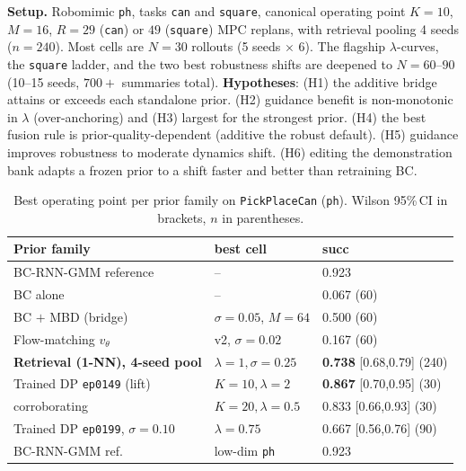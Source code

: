 \documentclass[letterpaper, 10 pt, conference]{ieeeconf}
\begin{document}
\textbf{Setup.} Robomimic \texttt{ph}, tasks \texttt{can} and
\texttt{square}, canonical operating point $K\!=\!10$, $M\!=\!16$,
$R\!=\!29$ (\texttt{can}) or $49$ (\texttt{square}) MPC replans, with
retrieval pooling 4 seeds ($n\!=\!240$). Most cells are $N\!=\!30$ rollouts
(5 seeds $\times$ 6). The flagship $\lambda$-curves, the \texttt{square}
ladder, and the two best robustness shifts are deepened to
$N\!=\!60$--$90$ (10--15 seeds, $700{+}$ summaries total).
\textbf{Hypotheses}: (H1) the additive bridge attains or exceeds each
standalone prior. (H2) guidance benefit is non-monotonic in $\lambda$
(over-anchoring) and (H3) largest for the strongest prior. (H4) the best
fusion rule is prior-quality-dependent (additive the robust default).
(H5) guidance improves robustness to moderate dynamics shift. (H6)
editing the demonstration bank adapts a frozen prior to a shift faster and
better than retraining BC.

\begin{table}[h]
\centering\scriptsize
\setlength{\tabcolsep}{2.5pt}
\renewcommand{\arraystretch}{0.95}
\caption{Best operating point per prior family on \texttt{PickPlaceCan}
(\texttt{ph}). Wilson 95\%\,CI in brackets, $n$ in parentheses.}
\label{tab:priors}
\begin{tabular}{@{}lll@{}}
\hline
Prior family & best cell & succ \\
\hline
BC-RNN-GMM reference                  & --                                 & 0.923 \\
BC alone                              & --                                 & 0.067 (60) \\
BC $+$ MBD (bridge)                   & $\sigma\!=\!0.05$, $M\!=\!64$       & 0.500 (60) \\
Flow-matching $v_\theta$              & v2, $\sigma\!=\!0.02$              & 0.167 (60) \\
\textbf{Retrieval (1-NN), 4-seed pool}& $\lambda\!=\!1,\sigma\!=\!0.25$    & \textbf{0.738} [0.68,0.79] (240) \\
Trained DP \texttt{ep0149} (lift)     & $K\!=\!10,\lambda\!=\!2$           & \textbf{0.867} [0.70,0.95] (30) \\
\quad corroborating                   & $K\!=\!20,\lambda\!=\!0.5$         & 0.833 [0.66,0.93] (30) \\
Trained DP \texttt{ep0199}, $\sigma\!=\!0.10$ & $\lambda\!=\!0.75$              & 0.667 [0.56,0.76] (90) \\
\hline
BC-RNN-GMM ref.~\cite{robomimic}      & low-dim \texttt{ph}                & 0.923 \\
\hline
\end{tabular}
\end{table}
\end{document}
